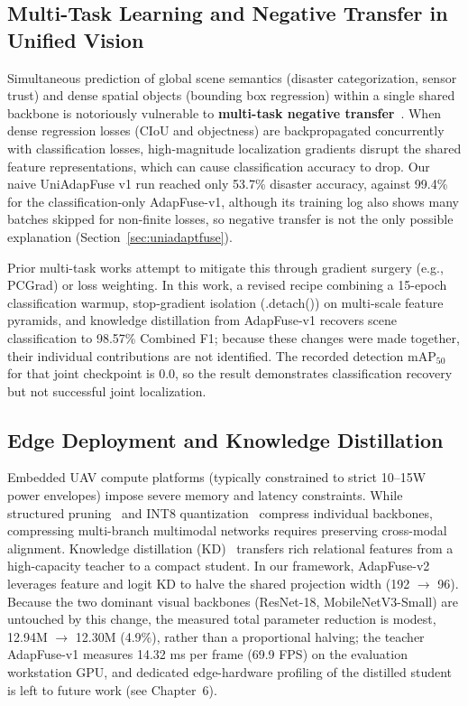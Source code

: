 \subsection{Multi-Task Learning and Negative Transfer in Unified Vision}

Simultaneous prediction of global scene semantics (disaster categorization, sensor trust) and dense spatial objects (bounding box regression) within a single shared backbone is notoriously vulnerable to \textbf{multi-task negative transfer}~\cite{yu2020gradient}. When dense regression losses (CIoU and objectness) are backpropagated concurrently with classification losses, high-magnitude localization gradients disrupt the shared feature representations, which can cause classification accuracy to drop. Our naive UniAdapFuse v1 run reached only 53.7\% disaster accuracy, against 99.4\% for the classification-only AdapFuse-v1, although its training log also shows many batches skipped for non-finite losses, so negative transfer is not the only possible explanation (Section~\ref{sec:uniadaptfuse}).

Prior multi-task works attempt to mitigate this through gradient surgery (e.g., PCGrad) or loss weighting. In this work, a revised recipe combining a 15-epoch classification warmup, stop-gradient isolation (.detach()) on multi-scale feature pyramids, and knowledge distillation from AdapFuse-v1 recovers scene classification to 98.57\% Combined F1; because these changes were made together, their individual contributions are not identified. The recorded detection $\mathrm{mAP}_{50}$ for that joint checkpoint is 0.0, so the result demonstrates classification recovery but not successful joint localization.

\subsection{Edge Deployment and Knowledge Distillation}

Embedded UAV compute platforms (typically constrained to strict 10--15W power envelopes) impose severe memory and latency constraints. While structured pruning~\cite{zhu2017prune} and INT8 quantization~\cite{jacob2018quantization} compress individual backbones, compressing multi-branch multimodal networks requires preserving cross-modal alignment. Knowledge distillation (KD)~\cite{hinton2015distilling} transfers rich relational features from a high-capacity teacher to a compact student. In our framework, AdapFuse-v2 leverages feature and logit KD to halve the shared projection width (192 $\to$ 96). Because the two dominant visual backbones (ResNet-18, MobileNetV3-Small) are untouched by this change, the measured total parameter reduction is modest, 12.94M $\to$ 12.30M (4.9\%), rather than a proportional halving; the teacher AdapFuse-v1 measures 14.32 ms per frame (69.9 FPS) on the evaluation workstation GPU, and dedicated edge-hardware profiling of the distilled student is left to future work (see Chapter~6).

